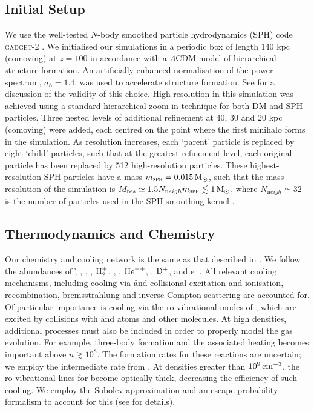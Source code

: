 \documentclass[../thesis.tex]{subfiles}
\begin{document}
\subsection{Initial Setup}
\label{setup}
We use the well-tested $N$-body smoothed particle hydrodynamics (SPH) code \textsc{gadget-2} \citep{Springel2005}. We initialised our simulations in a periodic box of length 140 kpc (comoving) at $z=100$ in accordance with a $\Lambda$CDM model of hierarchical structure formation. An artificially enhanced normalisation of the power spectrum, $\sigma_8 = 1.4$, was used to accelerate structure formation. See \citet{StacyGreifBromm2010} for a discussion of the validity of this choice. High resolution in this simulation was achieved using a standard hierarchical zoom-in technique for both DM and SPH particles. Three nested levels of additional refinement at 40, 30 and 20 kpc (comoving) were added, each centred on the point where the first minihalo forms in the simulation.  As resolution increases, each `parent' particle is replaced by eight `child' particles, such that at the greatest refinement level, each original particle has been replaced by 512 high-resolution particles.  These highest-resolution SPH particles have a mass $m_{\textsc{sph}} = 0.015\,\mathrm{M}_{\odot}$, such that the mass resolution of the simulation is $M_{\mathrm res} \simeq 1.5 N_{\mathrm neigh} m_{\textsc{sph}} \lesssim 1\,\mathrm{M}_{\odot}$, where $N_{\mathrm neigh} \simeq 32$ is the number of particles used in the SPH smoothing kernel \citep{BateBurkert1997}.

\subsection{Thermodynamics and Chemistry}
\label{chemistry}
Our chemistry and cooling network is the same as that described in \citet{Greifetal2009b}.  We follow the abundances of \h, \hplus, \hminus, \htwo, $\mathrm{H}_2^+$, \he, \heplus, $\mathrm{He}^{++}$, \deut, $\mathrm{D}^+$, \hd and e$^-$.  All relevant cooling mechanisms, including cooling via \h and \he collisional excitation and ionisation, recombination, bremsstrahlung and inverse Compton scattering are accounted for.  Of particular importance is cooling via the ro-vibrational modes of \htwo, which are excited by collisions with \h and \he atoms and other \htwo molecules.  At high densities, additional \htwo processes must also be included in order to properly model the gas evolution.  For example, three-body \htwo formation and the associated heating becomes important above $n\gtrsim10^8$\cc \citep{Turketal2011}.  The formation rates for these reactions are uncertain; we employ the intermediate rate from \citet{PallaSalpeterStahler1983}. At densities greater than \about$10^9\,\mathrm{cm}^{-3}$, the ro-vibrational lines for \htwo become optically thick, decreasing the efficiency of such cooling. We employ the Sobolev approximation and an escape probability formalism to account for this (see \citealt{Yoshidaetal2006, Greifetal2011} for details).
\end{document}
